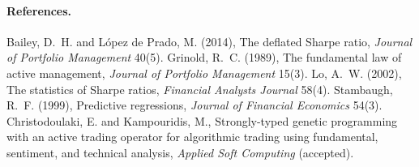 \documentclass[11pt,a4paper]{article}
\theoremstyle{remark}
\begin{document}
\paragraph{References.}
Bailey, D.~H. and L\'opez de Prado, M. (2014), The deflated Sharpe ratio, \emph{Journal of Portfolio Management} 40(5).
Grinold, R.~C. (1989), The fundamental law of active management, \emph{Journal of Portfolio Management} 15(3).
Lo, A.~W. (2002), The statistics of Sharpe ratios, \emph{Financial Analysts Journal} 58(4).
Stambaugh, R.~F. (1999), Predictive regressions, \emph{Journal of Financial Economics} 54(3).
Christodoulaki, E. and Kampouridis, M., Strongly-typed genetic programming with an active trading operator for algorithmic trading using fundamental, sentiment, and technical analysis, \emph{Applied Soft Computing} (accepted).
\end{document}
